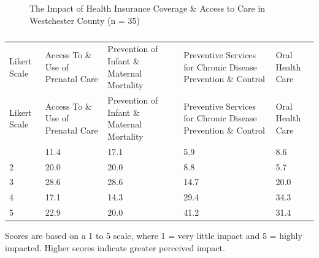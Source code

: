 \documentclass[
  english,
  letterpaper,
]{report}
\begin{document}
\begin{figure}


\caption{\label{fig-wc-impact-hlthinsur-access}The Impact of Health
Insurance Coverage \& Access to Care in Westchester County (n = 35)}

\end{figure}%

\begin{longtable}[]{@{}lllll@{}}

\caption{\label{tbl-wc-impact-hlthinsur-access}The Impact of Health
Insurance Coverage \& Access to Care in Westchester County (n = 35)}

\tabularnewline

\caption{}\label{T_19781}\tabularnewline
\toprule\noalign{}
Likert Scale & Access To \& Use of Prenatal Care & Prevention of Infant
\& Maternal Mortality & Preventive Services for Chronic Disease
Prevention \& Control & Oral Health Care \\
\midrule\noalign{}
\endfirsthead
\toprule\noalign{}
Likert Scale & Access To \& Use of Prenatal Care & Prevention of Infant
\& Maternal Mortality & Preventive Services for Chronic Disease
Prevention \& Control & Oral Health Care \\
\midrule\noalign{}
\endhead
\bottomrule\noalign{}
\endlastfoot
1 & 11.4 & 17.1 & 5.9 & 8.6 \\
2 & 20.0 & 20.0 & 8.8 & 5.7 \\
3 & 28.6 & 28.6 & 14.7 & 20.0 \\
4 & 17.1 & 14.3 & 29.4 & 34.3 \\
5 & 22.9 & 20.0 & 41.2 & 31.4 \\

\end{longtable}

\begin{tcolorbox}[enhanced jigsaw, breakable, leftrule=.75mm, title=\textcolor{quarto-callout-note-color}{\faInfo}\hspace{0.5em}{Note}, bottomrule=.15mm, opacityback=0, left=2mm, colback=white, bottomtitle=1mm, coltitle=black, colbacktitle=quarto-callout-note-color!10!white, colframe=quarto-callout-note-color-frame, opacitybacktitle=0.6, toptitle=1mm, titlerule=0mm, arc=.35mm, rightrule=.15mm, toprule=.15mm]

Scores are based on a 1 to 5 scale, where 1 = very little impact and 5 =
highly impacted. Higher scores indicate greater perceived impact.

\end{tcolorbox}
\end{document}

